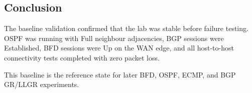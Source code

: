 \subsection{Conclusion}

The baseline validation confirmed that the lab was stable before failure testing. OSPF was running with Full neighbour adjacencies, BGP sessions were Established, BFD sessions were Up on the WAN edge, and all host-to-host connectivity tests completed with zero packet loss.

This baseline is the reference state for later BFD, OSPF, ECMP, and BGP GR/LLGR experiments.
